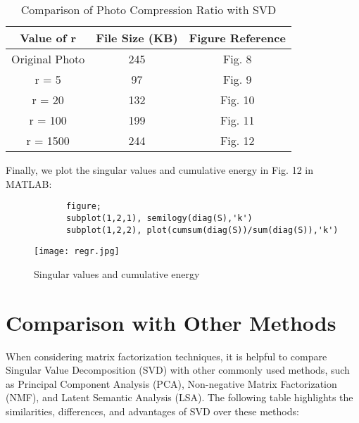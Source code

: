 \documentclass[a4paper]{article}
\begin{document}
{		\begin{table}[htbp]
			\centering
			\caption{Comparison of Photo Compression Ratio with SVD}
			\label{tab:compression-ratio}
			\begin{tabular}{|c|c|c|}
				\hline
				\textbf{Value of r} & \textbf{File Size (KB)} & \textbf{Figure Reference} \\
				\hline
				Original Photo & 245 & Fig. 8 \\
				\hline
				r = 5 & 97 & Fig. 9 \\
				\hline
				r = 20 & 132 & Fig. 10 \\
				\hline
				r = 100 & 199 & Fig. 11 \\
				\hline
				r = 1500 & 244 & Fig. 12 \\
				\hline
			\end{tabular}
		\end{table}
		
		
		
		
		\newpage
		
		Finally, we plot the singular values and cumulative energy in Fig. 12 in MATLAB:
		\begin{lstlisting}
			figure;
			subplot(1,2,1), semilogy(diag(S),'k')
			subplot(1,2,2), plot(cumsum(diag(S))/sum(diag(S)),'k')
		\end{lstlisting}
		\begin{figure}[H]
			\centering
			\texttt{[image: regr.jpg]}
			\caption[regression]{Singular values and cumulative energy\protect}
			\label{fig:example}
		\end{figure}
		\newpage
		\section{Comparison with Other Methods}
		When considering matrix factorization techniques, it is helpful to compare Singular Value Decomposition (SVD) with other commonly used methods, such as Principal Component Analysis (PCA), Non-negative Matrix Factorization (NMF), and Latent Semantic Analysis (LSA). The following table highlights the similarities, differences, and advantages of SVD over these methods:
		
}
\end{document}
